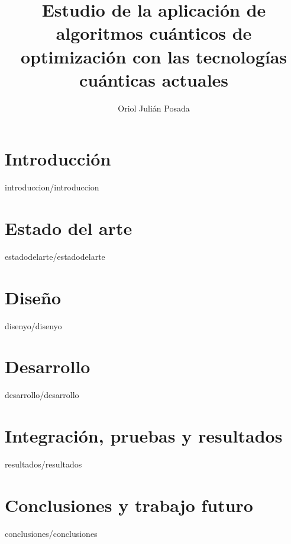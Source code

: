 \documentclass[epsbased,copyright,final,printable,covers,extendedindex,firstnumbered,tfg,gnuplot]{tfgtfmthesisuam}
\title{Estudio de la aplicación de algoritmos cuánticos de optimización con las tecnologías cuánticas actuales}
\author{Oriol Julián Posada}
\begin{document}
\chapter{Introducción\label{cap:introduccion}}{introduccion/introduccion}

\chapter{Estado del arte\label{CAP:ESTADODELARTE}}{estadodelarte/estadodelarte}

\chapter{Diseño\label{CAP:DISEÑO}}{disenyo/disenyo}

\chapter{Desarrollo\label{CAP:DESARROLLO}}{desarrollo/desarrollo}

\chapter{Integración, pruebas y resultados\label{CAP:RESULTADOS}}{resultados/resultados}

\chapter{Conclusiones y trabajo futuro\label{CAP:CONCLUSIONES}}{conclusiones/conclusiones}



\newpage
{}



\end{document}
